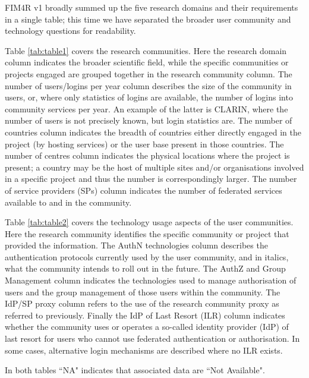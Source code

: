 \documentclass[fleqn,10pt]{wlscirep}
\begin{document}
{FIM4R v1 broadly summed up the five research domains and their requirements in a single table; this time we have separated the broader user community and technology questions for readability.

Table \ref{tab:table1} covers the research communities. Here the research domain column indicates the broader scientific field, while the specific communities or projects engaged are grouped together in the research community column. The number of users/logins per year column describes the size of the community in users, or, where only statistics of logins are available, the number of logins into community services per year. An example of the latter is CLARIN, where the number of users is not precisely known, but login statistics are. The number of countries column indicates the breadth of countries either directly engaged in the project (by hosting services) or the user base present in those countries. The number of centres column indicates the physical locations where the project is present; a country may be the host of multiple sites and/or organisations involved in a specific project and thus the number is correspondingly larger. The number of service providers (SPs) column indicates the number of federated services available to and in the community.

Table \ref{tab:table2} covers the technology usage aspects of the user communities. Here the research community identifies the specific community or project that provided the information. The AuthN technologies column describes the authentication protocols currently used by the user community, and in italics, what the community intends to roll out in the future. The AuthZ and Group Management column indicates the technologies used to manage authorisation of users and the group management of those users within the community. The IdP/SP proxy column refers to the use of the research community proxy as referred to previously. Finally the IdP of Last Resort (ILR) column indicates whether the community uses or operates a so-called identity provider (IdP) of last resort for users who cannot use federated authentication or authorisation. In some cases, alternative login mechanisms are described where no ILR exists.

In both tables ``NA" indicates that associated data are ``Not Available".
\pagebreak

}
\end{document}
